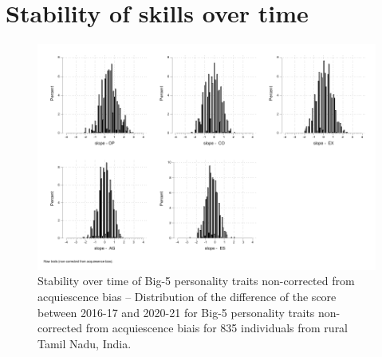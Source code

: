 \documentclass[a4paper, 11pt, onecolumn]{article}
\begin{document}
\section{Stability of skills over time}
\label{section:stab_big5}



\begin{figure}[!htb]
\raggedright
\includegraphics[scale=0.86]{INPUT/diffcont_raw}
\caption{Stability over time of Big-5 personality traits non-corrected from acquiescence bias -- Distribution of the difference of the score between 2016-17 and 2020-21 for Big-5 personality traits non-corrected from acquiescence biais for 835 individuals from rural Tamil Nadu, India.}
\label{fig:stabraw}
\end{figure}
\end{document}
